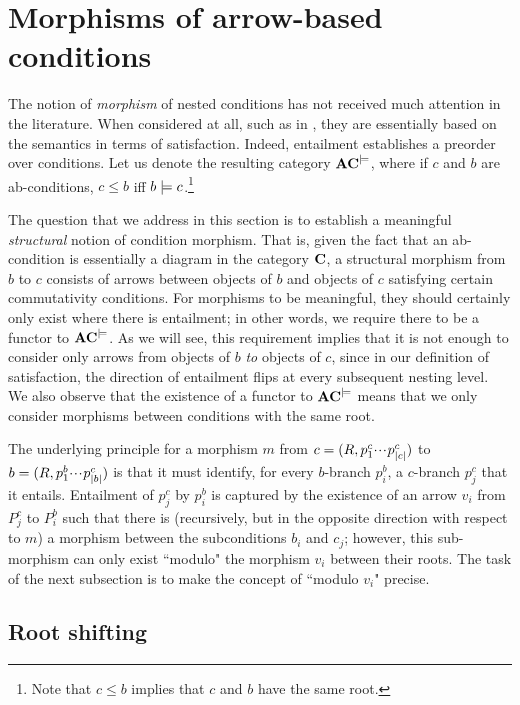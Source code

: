 \section{Morphisms of arrow-based conditions}

The notion of \emph{morphism} of nested conditions has not received much attention in the literature. When considered at all, such as in \cite{bchk:conditional-reactive-systems,sksclo:coinductive-techniques-for-satisfiability}, they are essentially based on the semantics in terms of satisfaction. Indeed, entailment establishes a preorder over conditions. Let us denote the resulting category $\mathbf{AC}^{\models}$, where if $c$ and $b$ are ab-conditions, $c \leq b$ iff $b \models c$.\footnote{Note that $c \leq b$ implies that $c$ and $b$ have the same root.} 

The question that we address in this section is to establish a meaningful \emph{structural} notion of condition morphism. That is, given the fact that an ab-condition is essentially a diagram in the category $\mathbf{C}$, a structural morphism from $b$ to $c$ consists of arrows between objects of $b$ and objects of $c$ satisfying certain commutativity conditions. For morphisms to be meaningful, they should certainly only exist where there is entailment; in other words, we require there to be a functor to $\mathbf{AC}^{\models}$. As we will see, this requirement implies that it is not enough to consider only arrows from objects of $b$ \emph{to} objects of $c$, since in our definition of satisfaction, the direction of entailment flips at every subsequent nesting level. We also observe that the existence of a functor to $\mathbf{AC}^{\models}$ means that we only consider morphisms between conditions with the same root.

The underlying principle for a morphism $m$ from $c=(R,p^c_1{\cdotp\mkern-2mu\cdotp\mkern-2mu\cdotp\mkern1mu} p^c_{|c|})$  to $b=(R,p^b_1{\cdotp\mkern-2mu\cdotp\mkern-2mu\cdotp\mkern1mu} p^c_{|b|})$  is that it must identify, for every $b$-branch $p^b_i$, a $c$-branch $p^c_j$ that it entails. Entailment of $p^c_j$ by $p^b_i$ is captured by the existence of an arrow $v_i$ from $P^c_j$ to $P^b_i$  such that there is (recursively, but in the opposite direction with respect to $m$) a morphism between the subconditions $b_i$ and $c_j$; however, this sub-morphism can only exist ``modulo" the morphism $v_i$ between their roots. The task of the next subsection is to make the concept of ``modulo $v_i$" precise.

\subsection{Root shifting}

